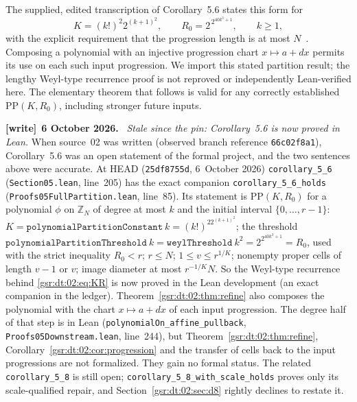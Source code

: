 \documentclass[11pt,letterpaper]{article}
\numberwithin{equation}{section}
\theoremstyle{definition}
\theoremstyle{remark}
\newcommand{\Z}{\mathbb Z}
\newcommand{\1}{\mathbf 1}
\newcommand{\file}[1]{\nolinkurl{#1}}
\newenvironment{writenote}[1][]{\par\smallskip\begingroup\small
 \noindent\textbf{[write]}\if\relax\detokenize{#1}\relax\else~\textbf{#1.}\fi\ }%
 {\par\endgroup\smallskip}
\begin{document}
The supplied, edited transcription of Corollary~5.6 states this form for
\begin{equation}\label{gsr:dt:02:eq:KR}
 K=(k!)^2 2^{(k+1)^2},\qquad
 R_0=2^{\,2^{40k^3+1}},\qquad k\geq1,
\end{equation}
with the explicit requirement that the progression length is at most $N$~\cite{repo02}. Composing a polynomial with an injective progression chart $x\mapsto a+dx$ permits its use on each such input progression. We import this stated partition result; the lengthy Weyl-type recurrence proof is not reproved or independently Lean-verified here. The elementary theorem that follows is valid for any correctly established $\mathrm{PP}(K,R_0)$, including stronger future inputs.
\begin{writenote}[6 October 2026]
\emph{Stale since the pin: Corollary~5.6 is now proved in Lean.} When source~02 was written (observed branch reference \texttt{66c02f8a1}), Corollary~5.6 was an open statement of the formal project, and the two sentences above were accurate. At HEAD (\texttt{25df8755d}, 6~October 2026) \file{corollary_5_6} (\file{Section05.lean}, line~205) has the exact companion \file{corollary_5_6_holds} (\file{Proofs05FullPartition.lean}, line~85). Its statement is $\mathrm{PP}(K,R_0)$ for a polynomial $\phi$ on $\Z_N$ of degree at most $k$ and the initial interval $\{0,\ldots,r-1\}$: $K=\texttt{polynomialPartitionConstant}\ k=(k!)^22^{(k+1)^2}$; the threshold $\texttt{polynomialPartitionThreshold}\ k=\texttt{weylThreshold}\ k^2=2^{2^{40k^3+1}}=R_0$, used with the strict inequality $R_0<r$; $r\le N$; $1\le v\le r^{1/K}$; nonempty proper cells of length $v-1$ or $v$; image diameter at most $r^{-1/K}N$. So the Weyl-type recurrence behind \eqref{gsr:dt:02:eq:KR} is now proved in the Lean development (an exact companion in the ledger). Theorem~\ref{gsr:dt:02:thm:refine} also composes the polynomial with the chart $x\mapsto a+dx$ of each input progression. The degree half of that step is in Lean (\file{polynomialOn_affine_pullback}, \file{Proofs05Downstream.lean}, line~244), but Theorem~\ref{gsr:dt:02:thm:refine}, Corollary~\ref{gsr:dt:02:cor:progression} and the transfer of cells back to the input progressions are not formalized. They gain no formal status. The related \file{corollary_5_8} is still open; \file{corollary_5_8_with_scale_holds} proves only its scale-qualified repair, and Section~\ref{gsr:dt:02:sec:d8} rightly declines to restate it.
\end{writenote}
\end{document}
